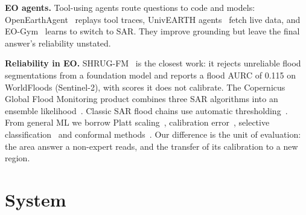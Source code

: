 \documentclass[conference]{IEEEtran}
\begin{document}
\textbf{EO agents.} Tool-using agents route questions to code and models: OpenEarthAgent~\cite{shabbir2026openearthagent} replays tool traces, UnivEARTH agents~\cite{kao2026univearth} fetch live data, and EO-Gym~\cite{ma2026eogym} learns to switch to SAR. They improve grounding but leave the final answer's reliability unstated.

\textbf{Reliability in EO.} SHRUG-FM~\cite{gonzalez2026shrug} is the closest work: it rejects unreliable flood segmentations from a foundation model and reports a flood AURC of 0.115 on WorldFloods (Sentinel-2), with scores it does not calibrate. The Copernicus Global Flood Monitoring product combines three SAR algorithms into an ensemble likelihood~\cite{krullikowski2023gfm}. Classic SAR flood chains use automatic thresholding~\cite{otsu1979threshold,twele2016s1flood}. From general ML we borrow Platt scaling~\cite{platt2000probabilities}, calibration error~\cite{guo2017calibration}, selective classification~\cite{geifman2017selective} and conformal methods~\cite{angelopoulos2021raps}. Our difference is the unit of evaluation: the area answer a non-expert reads, and the transfer of its calibration to a new region.

\section{System}
\label{sec:system}
\end{document}
